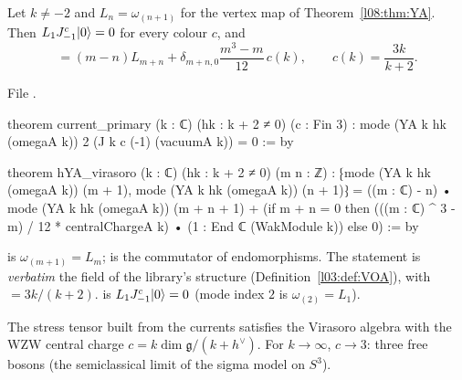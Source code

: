 \begin{theorem}\label{l08:thm:vir}
Let $k\ne-2$ and $L_n = \omega_{(n+1)}$ for the vertex map of Theorem~\ref{l08:thm:YA}. Then
$L_1J^c_{-1}|0\rangle = 0$ for every colour $c$, and
\begin{equation*}
  [L_m,L_n] = (m-n)L_{m+n} + \delta_{m+n,0}\frac{m^3-m}{12}\,c(k),\qquad c(k)=\frac{3k}{k+2}.
\end{equation*}
\end{theorem}

\noindent File .
\begin{leancode}
theorem current_primary (k : ℂ) (hk : k + 2 ≠ 0) (c : Fin 3) :
    mode (YA k hk (omegaA k)) 2 (J k c (-1) (vacuumA k)) = 0 := by

theorem hYA_virasoro (k : ℂ) (hk : k + 2 ≠ 0) (m n : ℤ) :
    ⁅mode (YA k hk (omegaA k)) (m + 1), mode (YA k hk (omegaA k)) (n + 1)⁆
      = ((m : ℂ) - n) • mode (YA k hk (omegaA k)) (m + n + 1)
        + (if m + n = 0 then
            (((m : ℂ) ^ 3 - m) / 12 * centralChargeA k) • (1 : End ℂ (WakModule k))
           else 0) := by
\end{leancode}

\begin{dictionary}
 is $\omega_{(m+1)} = L_m$;  is the commutator of
endomorphisms. The statement is \emph{verbatim} the field  of the library's
 structure (Definition~\ref{l03:def:VOA}), with
 $= 3k/(k+2)$.  is $L_1J^c_{-1}|0\rangle = 0$ (mode
index $2$ is $\omega_{(2)} = L_1$).
\end{dictionary}

\begin{physics}
The stress tensor built from the currents satisfies the Virasoro algebra with the WZW central charge
$c = k\dim\mathfrak g/(k+h^\vee)$. For $k\to\infty$, $c\to3$: three free bosons (the semiclassical
limit of the sigma model on $S^3$).
\end{physics}

